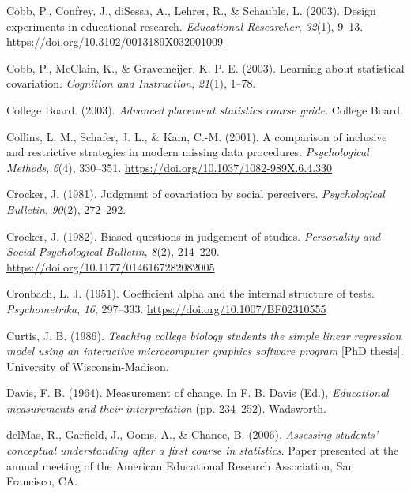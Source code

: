 \documentclass[11pt]{umnthesis}
\newlength{\cslhangindent}
\newenvironment{CSLReferences}[2] %
 {%
  \setlength{\parindent}{0pt}
  \ifodd #1 \everypar{\setlength{\hangindent}{\cslhangindent}}\ignorespaces\fi
  \ifnum #2 > 0
  \setlength{\parskip}{#2\baselineskip}
  \fi
 }%
 {}
\begin{document}
\begin{CSLReferences}{1}{0}
\leavevmode{}%
Cobb, P., Confrey, J., diSessa, A., Lehrer, R., \& Schauble, L. (2003). Design experiments in educational research. \emph{Educational Researcher}, \emph{32}(1), 9--13. \url{https://doi.org/10.3102/0013189X032001009}

\leavevmode{}%
Cobb, P., McClain, K., \& Gravemeijer, K. P. E. (2003). Learning about statistical covariation. \emph{Cognition and Instruction}, \emph{21}(1), 1--78.

\leavevmode{}%
College Board. (2003). \emph{Advanced placement statistics course guide}. {College Board}.

\leavevmode{}%
Collins, L. M., Schafer, J. L., \& Kam, C.-M. (2001). A comparison of inclusive and restrictive strategies in modern missing data procedures. \emph{Psychological Methods}, \emph{6}(4), 330--351. \url{https://doi.org/10.1037/1082-989X.6.4.330}

\leavevmode{}%
Crocker, J. (1981). Judgment of covariation by social perceivers. \emph{Psychological Bulletin}, \emph{90}(2), 272--292.

\leavevmode{}%
Crocker, J. (1982). Biased questions in judgement of studies. \emph{Personality and Social Psychological Bulletin}, \emph{8}(2), 214--220. \url{https://doi.org/10.1177/0146167282082005}

\leavevmode{}%
Cronbach, L. J. (1951). Coefficient alpha and the internal structure of tests. \emph{Psychometrika}, \emph{16}, 297--333. \url{https://doi.org/10.1007/BF02310555}

\leavevmode{}%
Curtis, J. B. (1986). \emph{Teaching college biology students the simple linear regression model using an interactive microcomputer graphics software program} {[}PhD thesis{]}. University of Wisconsin-Madison.

\leavevmode{}%
Davis, F. B. (1964). Measurement of change. In F. B. Davis (Ed.), \emph{Educational measurements and their interpretation} (pp. 234--252). Wadsworth.

\leavevmode{}%
delMas, R., Garfield, J., Ooms, A., \& Chance, B. (2006). \emph{Assessing students' conceptual understanding after a first course in statistics}. Paper presented at the annual meeting of the {A}merican {E}ducational {R}esearch {A}ssociation, {S}an {F}rancisco, {CA}.


\end{CSLReferences}
\end{document}
